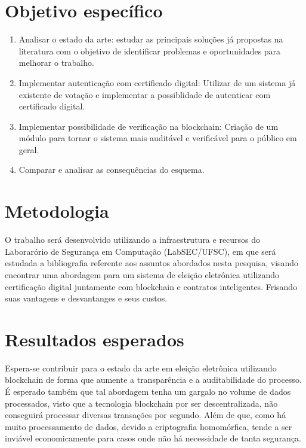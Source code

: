 \documentclass{ufsctex/ufsctex}
\begin{document}
\section{Objetivo específico}

\begin{enumerate}[label=\roman*.]
	\item Analisar o estado da arte: estudar as principais soluções
	já propostas na literatura com o objetivo de identificar problemas
	e oportunidades para melhorar o trabalho.
	\item Implementar autenticação com certificado digital: Utilizar
	de um sistema já existente de votação e implementar a possiblidade
	de autenticar com certificado digital.
	\item Implementar possibilidade de verificação na blockchain:
	Criação de  um módulo para tornar o sistema mais auditável e 
	verificável para o público em geral.
	\item Comparar e analisar as consequências do esquema.
\end{enumerate}

\section{Metodologia}

O trabalho será desenvolvido utilizando a infraestrutura e recursos do
Laborarório de Segurança em Computação (LabSEC/UFSC), em que será estudada
a bibliografia referente aos assuntos abordados nesta pesquisa, visando
encontrar uma abordagem para um sistema de eleição eletrônica utilizando
certificação digital juntamente com blockchain e contratos inteligentes.
Frisando suas vantagens e desvantanges e seus custos.

\section{Resultados esperados}

Espera-se contribuir para o estado da arte em eleição eletrônica utilizando
blockchain de forma que aumente a transparência e a auditabilidade do
processo. É esperado também que tal abordagem tenha um gargalo no volume de
dados processados, visto que a tecnologia blockchain por ser descentralizada,
não conseguirá processar diversas transações por segundo. Além de que,
como há muito processamento de dados, devido a criptografia homomórfica,
tende a ser inviável economicamente para casos onde não há necessidade de
tanta segurança.
\end{document}
